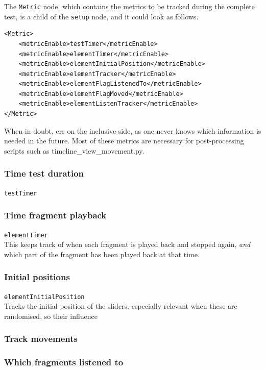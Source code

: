 \documentclass[11pt, oneside]{article}   	%
\begin{document}
		The \texttt{Metric} node, which contains the metrics to be tracked during the complete test, is a child of the \texttt{setup} node, and it could look as follows. 

		\begin{lstlisting}
<Metric>
	<metricEnable>testTimer</metricEnable>
	<metricEnable>elementTimer</metricEnable>
	<metricEnable>elementInitialPosition</metricEnable>
	<metricEnable>elementTracker</metricEnable>
	<metricEnable>elementFlagListenedTo</metricEnable>
	<metricEnable>elementFlagMoved</metricEnable>
	<metricEnable>elementListenTracker</metricEnable>
</Metric>
		\end{lstlisting}

		When in doubt, err on the inclusive side, as one never knows which information is needed in the future. Most of these metrics are necessary for post-processing scripts such as timeline\_view\_movement.py. 

		\subsubsection{Time test duration}
			\texttt{testTimer}\\

		\subsubsection{Time fragment playback}
			\texttt{elementTimer}\\
			This keeps track of when each fragment is played back and stopped again, \emph{and} which part of the fragment has been played back at that time. 

		\subsubsection{Initial positions}
			\texttt{elementInitialPosition}\\
			Tracks the initial position of the sliders, especially relevant when these are randomised, so their influence 

		\subsubsection{Track movements}

		\subsubsection{Which fragments listened to}
\end{document}
